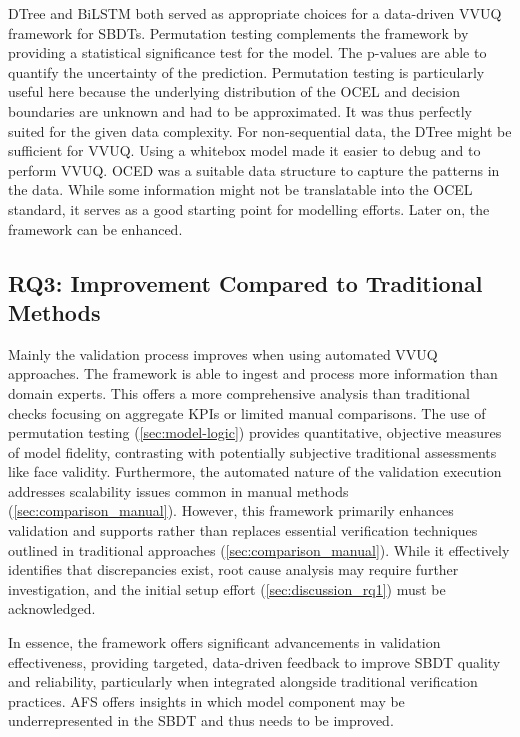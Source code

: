 DTree and BiLSTM both served as appropriate choices for a data-driven VVUQ framework for SBDTs. Permutation testing complements the framework by providing a statistical significance test for the model. The p-values are able to quantify the uncertainty of the prediction. Permutation testing is particularly useful here because the underlying distribution of the OCEL and decision boundaries are unknown and had to be approximated. It was thus perfectly suited for the given data complexity. For non-sequential data, the DTree might be sufficient for VVUQ. Using a whitebox model made it easier to debug and to perform VVUQ. OCED was a suitable data structure to capture the patterns in the data. While some information might not be translatable into the OCEL standard, it serves as a good starting point for modelling efforts. Later on, the framework can be enhanced.


\subsection{RQ3: Improvement Compared to Traditional Methods}
\label{sec:discussion_rq3}

Mainly the validation process improves when using automated VVUQ approaches. The framework is able to ingest and process more information than domain experts. This offers a more comprehensive analysis than traditional checks focusing on aggregate KPIs or limited manual comparisons. The use of permutation testing (\autoref{sec:model-logic}) provides quantitative, objective measures of model fidelity, contrasting with potentially subjective traditional assessments like face validity. Furthermore, the automated nature of the validation execution addresses scalability issues common in manual methods (\autoref{sec:comparison_manual}). However, this framework primarily enhances validation and supports rather than replaces essential verification techniques outlined in traditional approaches (\autoref{sec:comparison_manual}). While it effectively identifies that discrepancies exist, root cause analysis may require further investigation, and the initial setup effort (\autoref{sec:discussion_rq1}) must be acknowledged.

In essence, the framework offers significant advancements in validation effectiveness, providing targeted, data-driven feedback to improve SBDT quality and reliability, particularly when integrated alongside traditional verification practices. AFS offers insights in which model component may be underrepresented in the SBDT and thus needs to be improved.

